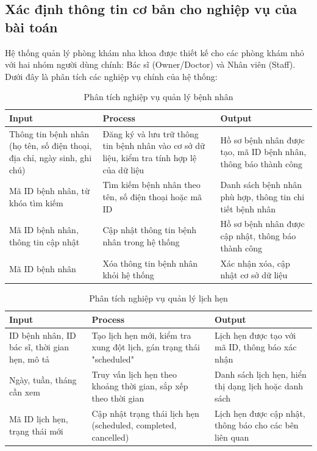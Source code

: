 \subsection{Xác định thông tin cơ bản cho nghiệp vụ của bài toán}

Hệ thống quản lý phòng khám nha khoa được thiết kế cho các phòng khám nhỏ với hai nhóm người dùng chính: Bác sĩ (Owner/Doctor) và Nhân viên (Staff). Dưới đây là phân tích các nghiệp vụ chính của hệ thống:

\begin{table}[h]
\centering
\caption{Phân tích nghiệp vụ quản lý bệnh nhân}
\begin{tabular}{|p{4cm}|p{5cm}|p{4.5cm}|}
\hline
\textbf{Input} & \textbf{Process} & \textbf{Output} \\
\hline
Thông tin bệnh nhân (họ tên, số điện thoại, địa chỉ, ngày sinh, ghi chú) & Đăng ký và lưu trữ thông tin bệnh nhân vào cơ sở dữ liệu, kiểm tra tính hợp lệ của dữ liệu & Hồ sơ bệnh nhân được tạo, mã ID bệnh nhân, thông báo thành công \\
\hline
Mã ID bệnh nhân, từ khóa tìm kiếm & Tìm kiếm bệnh nhân theo tên, số điện thoại hoặc mã ID & Danh sách bệnh nhân phù hợp, thông tin chi tiết bệnh nhân \\
\hline
Mã ID bệnh nhân, thông tin cập nhật & Cập nhật thông tin bệnh nhân trong hệ thống & Hồ sơ bệnh nhân được cập nhật, thông báo thành công \\
\hline
Mã ID bệnh nhân & Xóa thông tin bệnh nhân khỏi hệ thống & Xác nhận xóa, cập nhật cơ sở dữ liệu \\
\hline
\end{tabular}
\end{table}

\begin{table}[h]
\centering
\caption{Phân tích nghiệp vụ quản lý lịch hẹn}
\begin{tabular}{|p{4cm}|p{5cm}|p{4.5cm}|}
\hline
\textbf{Input} & \textbf{Process} & \textbf{Output} \\
\hline
ID bệnh nhân, ID bác sĩ, thời gian hẹn, mô tả & Tạo lịch hẹn mới, kiểm tra xung đột lịch, gán trạng thái "scheduled" & Lịch hẹn được tạo với mã ID, thông báo xác nhận \\
\hline
Ngày, tuần, tháng cần xem & Truy vấn lịch hẹn theo khoảng thời gian, sắp xếp theo thời gian & Danh sách lịch hẹn, hiển thị dạng lịch hoặc danh sách \\
\hline
Mã ID lịch hẹn, trạng thái mới & Cập nhật trạng thái lịch hẹn (scheduled, completed, cancelled) & Lịch hẹn được cập nhật, thông báo cho các bên liên quan \\
\hline
\end{tabular}
\end{table}

